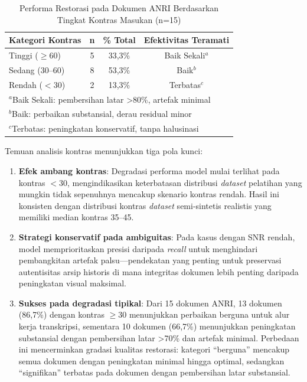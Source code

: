 \documentclass[12pt,a4paper]{article}
\begin{document}
\begin{table}[!t]
\renewcommand{\arraystretch}{1.3}
\caption{Performa Restorasi pada Dokumen ANRI Berdasarkan Tingkat Kontras Masukan (n=15)}
\label{table:anri_contrast_analysis}
\centering
\small
\begin{tabular}{|l|c|c|c|}
\hline
\textbf{Kategori Kontras} & \textbf{n} & \textbf{\% Total} & \textbf{Efektivitas Teramati} \\
\hline
Tinggi ($\geq$60) & 5 & 33,3\% & Baik Sekali$^a$ \\
Sedang (30--60) & 8 & 53,3\% & Baik$^b$ \\
Rendah ($<$30) & 2 & 13,3\% & Terbatas$^c$ \\
\hline
\multicolumn{4}{l}{\footnotesize $^a$Baik Sekali: pembersihan latar >80\%, artefak minimal} \\
\multicolumn{4}{l}{\footnotesize $^b$Baik: perbaikan substansial, derau residual minor} \\
\multicolumn{4}{l}{\footnotesize $^c$Terbatas: peningkatan konservatif, tanpa halusinasi} \\
\end{tabular}
\end{table}

Temuan analisis kontras menunjukkan tiga pola kunci:
\begin{enumerate}[nosep]
    \item \textbf{Efek ambang kontras}: Degradasi performa model mulai terlihat pada kontras $<$30, mengindikasikan keterbatasan distribusi \textit{dataset} pelatihan yang mungkin tidak sepenuhnya mencakup skenario kontras rendah. Hasil ini konsisten dengan distribusi kontras \textit{dataset} semi-sintetis realistis yang memiliki median kontras 35--45.
    
    \item \textbf{Strategi konservatif pada ambiguitas}: Pada kasus dengan SNR rendah, model memprioritaskan presisi daripada \textit{recall} untuk menghindari pembangkitan artefak palsu---pendekatan yang penting untuk preservasi autentisitas arsip historis di mana integritas dokumen lebih penting daripada peningkatan visual maksimal.
    
    \item \textbf{Sukses pada degradasi tipikal}: Dari 15 dokumen ANRI, 13 dokumen (86,7\%) dengan kontras $\geq$30 menunjukkan perbaikan berguna untuk alur kerja transkripsi, sementara 10 dokumen (66,7\%) menunjukkan peningkatan substansial dengan pembersihan latar >70\% dan artefak minimal. Perbedaan ini mencerminkan gradasi kualitas restorasi: kategori ``berguna'' mencakup semua dokumen dengan peningkatan minimal hingga optimal, sedangkan ``signifikan'' terbatas pada dokumen dengan pembersihan latar substansial.
\end{enumerate}
\end{document}
